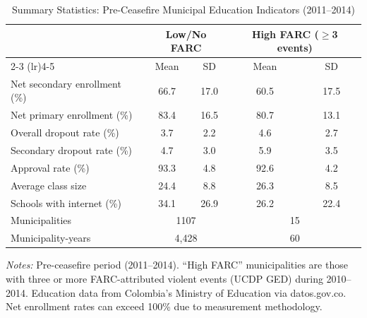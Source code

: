 \begin{table}[H]
\centering
\caption{Summary Statistics: Pre-Ceasefire Municipal Education Indicators (2011--2014)}
\label{tab:summary}
\begin{threeparttable}
\begin{tabular}{lcccc}
\toprule
 & \multicolumn{2}{c}{Low/No FARC} & \multicolumn{2}{c}{High FARC ($\geq$3 events)} \\
\cmidrule(lr){2-3} \cmidrule(lr){4-5}
 & Mean & SD & Mean & SD \\
\midrule
Net secondary enrollment (\%) & 66.7 & 17.0 & 60.5 & 17.5 \\
Net primary enrollment (\%) & 83.4 & 16.5 & 80.7 & 13.1 \\
Overall dropout rate (\%) & 3.7 & 2.2 & 4.6 & 2.7 \\
Secondary dropout rate (\%) & 4.7 & 3.0 & 5.9 & 3.5 \\
Approval rate (\%) & 93.3 & 4.8 & 92.6 & 4.2 \\
Average class size & 24.4 & 8.8 & 26.3 & 8.5 \\
Schools with internet (\%) & 34.1 & 26.9 & 26.2 & 22.4 \\
\midrule
Municipalities & \multicolumn{2}{c}{1107} & \multicolumn{2}{c}{15} \\
Municipality-years & \multicolumn{2}{c}{4,428} & \multicolumn{2}{c}{60} \\
\bottomrule
\end{tabular}
\begin{tablenotes}[flushleft]
\small
\item \textit{Notes:} Pre-ceasefire period (2011--2014). ``High FARC'' municipalities are those with three or more FARC-attributed violent events (UCDP GED) during 2010--2014. Education data from Colombia's Ministry of Education via datos.gov.co. Net enrollment rates can exceed 100\% due to measurement methodology.
\end{tablenotes}
\end{threeparttable}
\end{table}

